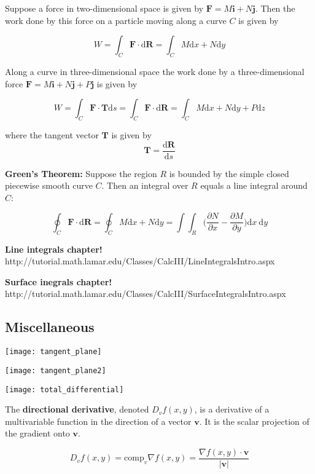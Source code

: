 Suppose a force in two-dimensional space is given by \(\boldsymbol{F} = M\boldsymbol{i} + N \boldsymbol{j}\). Then the work done by this force on a particle moving along a curve \(C\) is given by

\[
W = \int_C \boldsymbol{F} \cdot \text{d}\boldsymbol{R} = \int_C M \text{d}x + N \text{d} y
\]

Along a curve in three-dimensional space the work done by a three-dimensional force \(\boldsymbol{F} = M\boldsymbol{i} + N \boldsymbol{j} + P \boldsymbol{j}\) is given by

\[
W = \int_C \boldsymbol{F} \cdot \boldsymbol{T} \text{d}s = \int_C \boldsymbol{F} \cdot \text{d}\boldsymbol{R} = \int_C M \text{d}x + N \text{d}y + P \text{d}z
\]

where the tangent vector \(\boldsymbol{T}\) is given by \[\boldsymbol{T} = \frac{\text{d}\boldsymbol{R}}{\text{d}s}\]

\textbf{Green's Theorem:} Suppose the region \(R\) is bounded by the simple closed piecewise smooth curve \(C\). Then an integral over \(R\) equals a line integral around \(C\):

\[
\oint_C \boldsymbol{F} \cdot \text{d}\boldsymbol{R} = \oint_C M \text{d}x + N \text{d}y = \int \int_R \bigg( \frac{\partial N}{\partial x} - \frac{\partial M}{\partial y} \bigg) \text{d}x \ \text{d}y
\]

\textbf{Line integrals chapter!} http://tutorial.math.lamar.edu/Classes/CalcIII/LineIntegralsIntro.aspx

\textbf{Surface inegrals chapter!} http://tutorial.math.lamar.edu/Classes/CalcIII/SurfaceIntegralsIntro.aspx

\subsection{Miscellaneous}

\texttt{[image: tangent\_plane]}

\texttt{[image: tangent\_plane2]}

\texttt{[image: total\_differential]}

The \textbf{directional derivative}, denoted \(D_v f(x, y)\), is a derivative of a multivariable function in the direction of a vector \(\boldsymbol{v}\). It is the scalar projection of the gradient onto \(\boldsymbol{v}\).

\[
D_v f(x, y) = \text{comp}_v \nabla f(x, y) = \frac{\nabla f(x, y) \cdot \boldsymbol{v}}{|\boldsymbol{v}|}
\]


